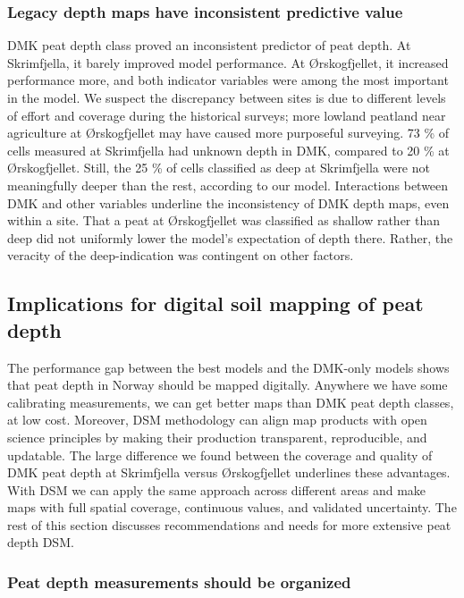 \documentclass[soil, manuscript]{copernicus}
\begin{document}
\subsubsection{Legacy depth maps have inconsistent predictive value}

DMK peat depth class proved an inconsistent predictor of peat depth.
At Skrimfjella, it barely improved model performance.
At Ørskogfjellet, it increased performance more, and both indicator variables were among the most important in the model.
We suspect the discrepancy between sites is due to different levels of effort and coverage during the historical surveys; more lowland peatland near agriculture at Ørskogfjellet may have caused more purposeful surveying.
73 \% of cells measured at Skrimfjella had unknown depth in DMK, compared to 20 \% at Ørskogfjellet.
Still, the 25 \% of cells classified as deep at Skrimfjella were not meaningfully deeper than the rest, according to our model.
Interactions between DMK and other variables underline the inconsistency of DMK depth maps, even within a site.
That a peat at Ørskogfjellet was classified as shallow rather than deep did not uniformly lower the model's expectation of depth there.
Rather, the veracity of the deep-indication was contingent on other factors.

\subsection{Implications for digital soil mapping of peat depth}

The performance gap between the best models and the DMK-only models shows that peat depth in Norway should be mapped digitally.
Anywhere we have some calibrating measurements, we can get better maps than DMK peat depth classes, at low cost.
Moreover, DSM methodology can align map products with open science principles by making their production transparent, reproducible, and updatable.
The large difference we found between the coverage and quality of DMK peat depth at Skrimfjella versus Ørskogfjellet underlines these advantages.
With DSM we can apply the same approach across different areas and make maps with full spatial coverage, continuous values, and validated uncertainty.
The rest of this section discusses recommendations and needs for more extensive peat depth DSM.

\subsubsection{Peat depth measurements should be organized}
\end{document}
